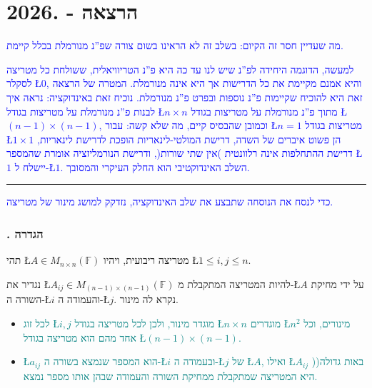 \documentclass[english,hebrew]{article}
\begin{document}
\part{הרצאה {\endL} - {.2026\endL}}

\textcolor{blue}{מה שעדיין חסר זה הקיום: בשלב זה לא הראינו בשום צורה
שפ\textquotedblright נ מנורמלת בכלל קיימת.}

\textcolor{blue}{למעשה, הדוגמה היחידה לפ\textquotedblright נ שיש לנו
עד כה היא פ\textquotedblright נ הטריוויאלית, ששולחת כל מטריצה לסקלר
\L{$0$}, והיא אמנם מקיימת את כל הדרישות אך היא אינה מנורמלת. המטרה
של הרצאה זאת היא להוכיח שקיימות פ\textquotedblright נ נוספות ובפרט
פ\textquotedblright נ מנורמלת. נוכיח זאת באינדוקציה: נראה איך לבנות
פ\textquotedblright נ מנורמלת על מטריצות בגודל \L{$n\times n$} מתוך
פ\textquotedblright נ מנורמלת על מטריצות בגודל \L{$(n-1)\times(n-1)$},
וכמובן שהבסיס קיים, מה שלא קשה: עבור \L{$n=1$} מטריצות בגודל \L{$1\times1$}
הן פשוט איברים של השדה, דרישת המולטי-לינאריות הופכת לדרישת לינאריות,
דרישת ההתחלפות אינה רלוונטית )אין שתי שורות(, ודרישת הנורמליזציה אומרת
שהמספר \L{$1$} יישלח ל-\L{$1$}. השלב האינדוקטיבי הוא החלק העיקרי
והמסובך.}

\medskip{}

\rule[0.5ex]{1\columnwidth}{1pt}

\medskip{}

\textcolor{blue}{כדי לנסח את הנוסחה שתבצע את שלב האינדוקציה, נזדקק
למושג מינור של מטריצה.}

\section{{\endL}. הגדרה}

תהי \L{$A\in M_{n\times n}(\mathbb{F})$} מטריצה ריבועית, ויהיו \L{$1\le i,j\le n$}. 

נגדיר את \L{$A_{ij}\in M_{(n-1)\times(n-1)}(\mathbb{F})$} להיות המטריצה
המתקבלת מ-\L{$A$} על ידי מחיקת השורה ה-\L{$i$} והעמודה ה-\L{$j$}.
נקרא לה מינור.
\begin{itemize}
\item \textcolor{teal}{לכל זוג \L{$i,j$} מוגדר מינור, ולכן לכל מטריצה בגודל
\L{$n\times n$} מוגדרים \L{$n^{2}$} מינורים, וכל אחד מהם הוא מטריצה
בגודל \L{$(n-1)\times(n-1)$}.}
\item \textcolor{teal}{\L{$a_{ij}$} הוא המספר שנמצא בשורה ה-\L{$i$} ובעמודה
ה-\L{$j$} של \L{$A$}, ואילו \L{$A_{ij}$} )באות גדולה( היא המטריצה
שמתקבלת ממחיקת השורה והעמודה שבהן אותו מספר נמצא.}
\end{itemize}
\end{document}
